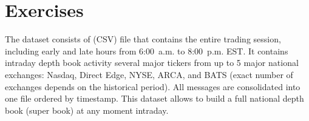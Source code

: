 \section{Exercises}

The dataset consists of (CSV) file that contains the entire trading session, including early and late hours from 6:00~a.m. to 8:00~p.m. EST. It contains intraday depth book activity several major tickers from up to 5 major national exchanges: Nasdaq, Direct Edge, NYSE, ARCA, and BATS (exact number of exchanges depends on the historical period). All messages are consolidated into one file ordered by timestamp. This dataset allows to build a full national depth book (super book) at any moment intraday. 



